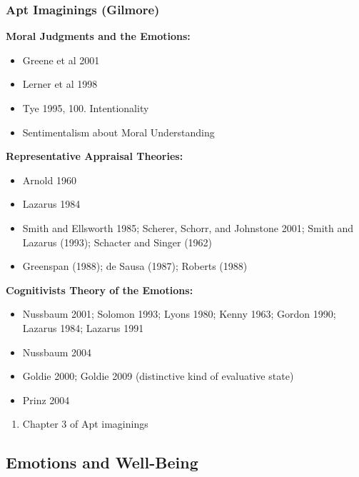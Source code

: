 \documentclass[11pt,]{article}
\providecommand{\tightlist}{%
  \setlength{\itemsep}{0pt}\setlength{\parskip}{0pt}}
\begin{document}
\subsubsection{Apt Imaginings (Gilmore)}\label{apt-imaginings-gilmore}

\textbf{Moral Judgments and the Emotions:}

\begin{itemize}
\tightlist
\item
  Greene et al 2001
\item
  Lerner et al 1998
\item
  Tye 1995, 100. Intentionality
\item
  Sentimentalism about Moral Understanding
\end{itemize}

\textbf{Representative Appraisal Theories:}

\begin{itemize}
\tightlist
\item
  Arnold 1960
\item
  Lazarus 1984
\item
  Smith and Ellsworth 1985; Scherer, Schorr, and Johnstone 2001; Smith
  and Lazarus (1993); Schacter and Singer (1962)
\item
  Greenspan (1988); de Sausa (1987); Roberts (1988)
\end{itemize}

\textbf{Cognitivists Theory of the Emotions:}

\begin{itemize}
\tightlist
\item
  Nussbaum 2001; Solomon 1993; Lyons 1980; Kenny 1963; Gordon 1990;
  Lazarus 1984; Lazarus 1991
\item
  Nussbaum 2004
\item
  Goldie 2000; Goldie 2009 (distinctive kind of evaluative state)
\item
  Prinz 2004
\end{itemize}

\begin{enumerate}
\def\labelenumi{\arabic{enumi}.}
\setcounter{enumi}{1}
\tightlist
\item
  Chapter 3 of Apt imaginings
\end{enumerate}

\subsection{Emotions and Well-Being}\label{emotions-and-well-being}
\end{document}
